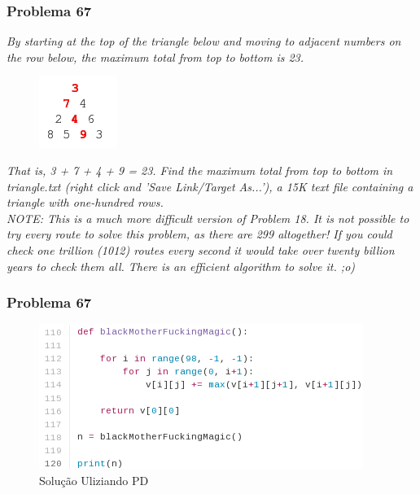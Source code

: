 \documentclass{beamer}
\begin{document}
\begin{frame}
    \frametitle{Problema 67}

    \begin{center}
        \textit{
            By starting at the top of the triangle below and moving to adjacent numbers on the row below, the maximum total from top to bottom is 23.
        }
        \begin{figure}[htpb]
            \includegraphics[width=0.2\linewidth]{images/p18_1.png}
        \end{figure}
        \textit{
            That is, 3 + 7 + 4 + 9 = 23.
            Find the maximum total from top to bottom in triangle.txt (right click and 'Save Link/Target As...'), a 15K text file containing a triangle with one-hundred rows.\\
        }
        \textit{
            \footnotesize NOTE: This is a much more difficult version of Problem 18. It is not possible to try every route to solve this problem, as there are 299 altogether! If you could check one trillion (1012) routes every second it would take over twenty billion years to check them all. There is an efficient algorithm to solve it. ;o)
        }
    \end{center}

\end{frame}

\begin{frame}
    \frametitle{Problema 67}

    \begin{figure}[htpb]
        \centering
        \includegraphics[width=0.8\linewidth]{images/prob67.png}
        \caption{Solução Uliziando PD}
    \end{figure}

\end{frame}
\end{document}

